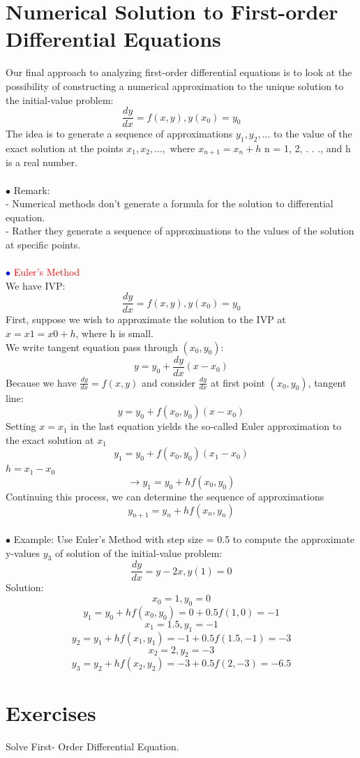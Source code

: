 \documentclass[12pt]{article}
\begin{document}
\section{Numerical Solution to First-order Differential Equations}
Our final approach to analyzing first-order differential equations is to
look at the possibility of constructing a numerical approximation to the
unique solution to the initial-value problem: 
$$\frac{dy}{dx} = f(x,y), y(x_0) =y_0$$
The idea is to generate a sequence of approximations $y_1, y_2, . . .$ to the
value of the exact solution at the points $x_1, x_2, . . .,$ where $x_{n+1} = x_n + h$
n = 1, 2, . . ., and h is a real number.\\ 
\\
$\bullet$ Remark: \\
- Numerical methods don’t generate a formula for the solution to
differential equation. 
\\
- Rather they generate a sequence of approximations to the values
of the solution at specific points.\\
\\
\textcolor{blue}{$\bullet$} \textcolor{red}{Euler's Method} 
\\
 We have IVP: 
$$\frac{dy}{dx} = f(x,y), y(x_0) =y_0$$
First, suppose we wish to approximate the solution to the IVP at
$x = x1 = x0 + h$, where h is small.
\\
We write tangent equation pass through $(x_0,y_0)$:
$$y = y_0 + \frac{dy}{dx}(x-x_0)$$
Because we have $\frac{dy}{dx}=f(x,y)$ and consider $\frac{dy}{dx}$ at first point $(x_0,y_0)$, tangent line: 
$$y = y_0 + f(x_0,y_0)(x-x_0)$$
Setting $x = x_1$ in the last equation yields the so-called Euler
approximation to the exact solution at $x_1$ 
$$y_1 = y_0 + f(x_0,y_0)(x_1-x_0)$$
$h = x_1 -x_0$ 
$$\rightarrow y_1 = y_0 + hf(x_0,y_0)$$
Continuing this process, we can determine the sequence of
approximations
$$y_{n+1}=y_n + hf(x_n,y_n)$$
\\
$\bullet$ Example: Use Euler's Method with step size = 0.5 to compute the
 approximate y-values $y_3$ of solution of the initial-value problem:
 $$\frac{dy}{dx} = y - 2x, y(1) =0$$
 Solution: \\
 $$x_0 = 1, y_0 =0$$
 $$y_1 =y_0 +hf(x_0,y_0) = 0 + 0.5f(1,0) = -1$$
 $$x_1 =1.5 , y_1 = -1$$
 $$y_2 = y_1 + hf(x_1,y_1) = -1 + 0.5f(1.5,-1) = -3$$
 $$x_2 = 2, y_2 = -3$$
 $$y_3 = y_2 +hf(x_2,y_2) = -3 + 0.5f(2,-3) = -6.5$$
 \newpage
 \section{Exercises}
 Solve First- Order Differential Equation.
 
\end{document}
